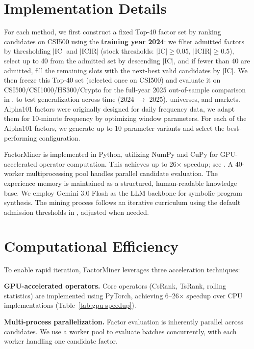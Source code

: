 \documentclass[sigconf]{acmart}
\begin{document}
\section{Implementation Details}
\label{app:implementation}

For each method, we first construct a fixed Top-40 factor set by ranking candidates on CSI500 using the \textbf{training year 2024}: we filter admitted factors by thresholding $|\text{IC}|$ and $|\text{ICIR}|$ (stock thresholds: $|\text{IC}|\!\ge\!0.05$, $|\text{ICIR}|\!\ge\!0.5$), select up to 40 from the admitted set by descending $|\text{IC}|$, and if fewer than 40 are admitted, fill the remaining slots with the next-best valid candidates by $|\text{IC}|$. We then freeze this Top-40 set (selected once on CSI500) and evaluate it on CSI500/CSI1000/HS300/Crypto for the full-year 2025 out-of-sample comparison in , to test generalization across time (2024 $\rightarrow$ 2025), universes, and markets. Alpha101 factors were originally designed for daily frequency data, we adapt them for 10-minute frequency by optimizing window parameters. For each of the Alpha101 factors, we generate up to 10 parameter variants and select the best-performing configuration.

FactorMiner is implemented in Python, utilizing NumPy and CuPy for GPU-accelerated operator computation. This achieves up to 26$\times$ speedup; see . 
A 40-worker multiprocessing pool handles parallel candidate evaluation. 
The experience memory is maintained as a structured, human-readable knowledge base. 
We employ Gemini 3.0 Flash as the LLM backbone for symbolic program synthesis. 
The mining process follows an iterative curriculum using the default admission thresholds in , adjusted when needed.

\section{Computational Efficiency}
\label{app:efficiency}

To enable rapid iteration, FactorMiner leverages three acceleration techniques:

\textbf{GPU-accelerated operators.}
Core operators (CsRank, TsRank, rolling statistics) are implemented using PyTorch, achieving 6--26$\times$ speedup over CPU implementations (Table~\ref{tab:gpu-speedup}).

\textbf{Multi-process parallelization.}
Factor evaluation is inherently parallel across candidates.
We use a worker pool to evaluate batches concurrently, with each worker handling one candidate factor.
\end{document}
